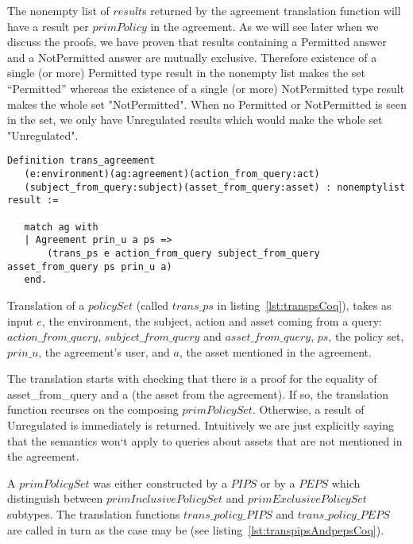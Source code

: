 The nonempty list of $result$s returned by the agreement translation function will have a result per $primPolicy$ in the agreement. As we will see later when we discuss the proofs, we have proven that results containing a Permitted answer and a NotPermitted answer are mutually exclusive. Therefore existence of a single (or more) Permitted type result in the nonempty list makes the set ``Permitted'' whereas the existence of a single (or more) NotPermitted type result makes the whole set "NotPermitted". When no Permitted or NotPermitted is seen in the set, we only have Unregulated results which would make the whole set "Unregulated". 

\begin{lstlisting}
Definition trans_agreement
   (e:environment)(ag:agreement)(action_from_query:act)
   (subject_from_query:subject)(asset_from_query:asset) : nonemptylist result :=

   match ag with
   | Agreement prin_u a ps => 
       (trans_ps e action_from_query subject_from_query asset_from_query ps prin_u a)
   end.
\end{lstlisting}

Translation of a $policySet$ (called $trans\_ps$ in listing~\ref{lst:transpsCoq}), takes as input $e$, the environment, the subject, action and asset coming from a query: $action\_from\_query$, $subject\_from\_query$ and $asset\_from\_query$, $ps$, the policy set, $prin\_{u}$, the agreement's user, and $a$, the asset mentioned in the agreement. 

The translation starts with checking that there is a proof for the equality of asset_from_query and a (the asset from the agreement). If so, the translation function recurses on the composing $primPolicySet$. Otherwise, a result of Unregulated is immediately is returned. Intuitively we are just explicitly saying that the semantics won`t apply to queries about assets that are not mentioned in the agreement. 

A $primPolicySet$ was either constructed by a $PIPS$ or by a $PEPS$ which distinguish between $primInclusivePolicySet$ and $primExclusivePolicySet$ subtypes. The translation functions $trans\_policy\_PIPS$ and $trans\_policy\_PEPS$ are called in turn as the case may be (see listing~\ref{lst:transpipsAndpepsCoq}).

